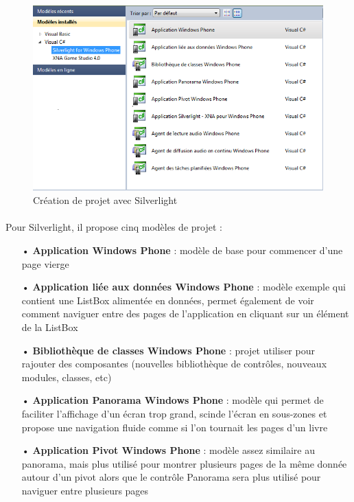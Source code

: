 \documentclass[twoside,UTF8]{EPURapport}
\begin{document}
	\begin{figure}[H]	
		\center
		\includegraphics[scale=0.6]{images/creaprojetsilverlight.png}		
		\caption{Création de projet avec Silverlight}
	\end{figure}

\paragraph{}
Pour Silverlight, il propose cinq modèles de projet : 
\begin{itemize}
	\item[•]\textbf{Application Windows Phone} : modèle de base pour commencer d'une page vierge
	\item[•]\textbf{Application liée aux données Windows Phone} : modèle exemple qui contient une ListBox alimentée en données, permet également de voir comment naviguer entre des pages de l'application en cliquant sur un élément de la ListBox
	\item[•]\textbf{Bibliothèque de classes Windows Phone} : projet utiliser pour rajouter des composantes (nouvelles bibliothèque de contrôles, nouveaux modules, classes, etc)
	\item[•]\textbf{Application Panorama Windows Phone} : modèle qui permet de faciliter l'affichage d'un écran trop grand, scinde l'écran en sous-zones et propose une navigation fluide comme si l'on tournait les pages d'un livre
	\item[•]\textbf{Application Pivot Windows Phone} : modèle assez similaire au panorama, mais plus utilisé pour montrer plusieurs pages de la même donnée autour d'un pivot alors que le contrôle Panorama sera plus utilisé pour naviguer entre plusieurs pages
\end{itemize}
\end{document}
